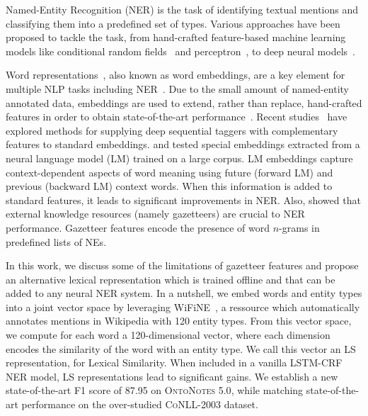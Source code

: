 \documentclass[11pt]{article}
\newcommand{\conll}{\textsc{CoNLL}}
\newcommand{\onto}{\textsc{OntoNotes}}
\newcommand{\lr}{\textsc{LS}}
\newcommand{\wifine}{WiFiNE}
\newcommand{\felipe}[2]{}
\begin{document}
	
	
	
	
	Named-Entity Recognition (NER) is the task of identifying textual mentions and classifying them into a predefined set of types.   Various approaches have been proposed to tackle the task, from hand-crafted feature-based machine learning models like conditional random fields~\cite{finkel2005incorporating} and perceptron~\cite{ratinov2009design}, to deep neural models~\cite{collobert2011natural,ma2016end,strubell2017fast}.
	
	Word representations~\cite{turian2010word,mikolov2013distributed}, also known as word embeddings, are a key element for multiple NLP tasks including NER~\cite{collobert2011natural}. Due to the small amount of named-entity annotated data, embeddings are used to extend, rather than replace, hand-crafted features in order to obtain state-of-the-art performance~\cite{lample2016neural}. 
	Recent studies~\cite{yang2017neural,sogaard2016deep} have explored methods for supplying deep sequential taggers with complementary features to standard embeddings.  and  tested special embeddings extracted from a neural language model (LM) trained on a large corpus. LM embeddings capture context-dependent aspects of word meaning using future (forward LM) and previous (backward LM) context words. When this information is added to standard features, it leads to significant improvements in NER. 	Also,  showed that external knowledge resources (namely gazetteers) are crucial to NER performance. Gazetteer features encode the presence of word $n$-grams in predefined lists of NEs. 
	
	In this work, we discuss some of the limitations of gazetteer features and propose an alternative lexical representation which is trained offline and that can  be added to any neural NER system. In a nutshell, we embed words and entity types into a joint vector space by leveraging  \wifine~\cite{ghaddara2018wifine}, a ressource which automatically annotates mentions in Wikipedia with 120 entity types. From  this vector space, we compute for each word a  120-dimensional vector, where each dimension encodes the similarity of the word with an entity type. We call this vector an \lr{} representation, for Lexical Similarity. When included in a vanilla LSTM-CRF NER model, \lr{} representations lead to significant gains.  We establish a new state-of-the-art F1 score of  87.95 on \onto{ 5.0}, while matching state-of-the-art performance on the over-studied \conll{-2003} dataset. \felipe{, without making use of LM embeddings as features.}{Unsure this is claim you want to make: because it raises the question: why the hell not?}
\end{document}
